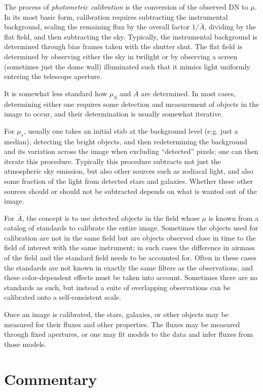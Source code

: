 The process of {\it photometric calibration} is the conversion of the
observed DN to $\mu$. In its most basic form, calibration requires
subtracting the instrumental background, scaling the remaining flux by
the overall factor $1/\bar{A}$, dividing by the flat field, and then
subtracting the sky. Typically, the instrumental background is
determined through bias frames taken with the shutter shut.  The flat
field is determined by observing either the sky in twilight or by
observing a screen (sometimes just the dome wall) illuminated such
that it mimics light uniformly entering the telescope aperture.

It is somewhat less standard how $\mu_S$ and $\bar{A}$ are
determined. In most cases, determining either one requires some
detection and measurement of objects in the image to occur, and their
determination is usually somewhat iterative.

For $\mu_s$, usually one takes an initial stab at the background level
(e.g. just a median), detecting the bright objects, and then
redetermining the background and its variation across the image when
excluding ``detected'' pixels; one can then iterate this
procedure. Typically this procedure subtracts not just the atmospheric
sky emission, but also other sources such as zodiacal light, and also
some fraction of the light from detected stars and galaxies. Whether
these other sources should or should not be subtracted depends on what
is wanted out of the image.

For $\bar{A}$, the concept is to use detected objects in the field
whose $\mu$ is known from a catalog of standards to calibrate the
entire image. Sometimes the objects used for calibration are not in
the same field but are objects observed close in time to the field of
interest with the same instrument; in such cases the difference in
airmass of the field and the standard field needs to be accounted
for. Often in these cases the standards are not known in exactly the
same filters as the observations, and these color-dependent effects
must be taken into account. Sometimes there are no standards as such,
but instead a suite of overlapping observations can be calibrated onto
a self-consistent scale.

Once an image is calibrated, the stars, galaxies, or other objects may
be measured for their fluxes and other properties. The fluxes may be
measured through fixed apertures, or one may fit models to the data
and infer fluxes from those models.

\section{Commentary}

